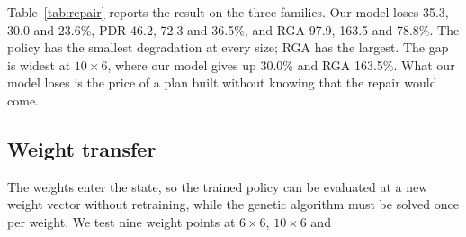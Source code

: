 Table~\ref{tab:repair} reports the result on the three families. Our model loses 35.3, 30.0 and 23.6\%, PDR 46.2, 72.3 and 36.5\%, and RGA
97.9, 163.5 and 78.8\%. The policy has the smallest degradation at every size;
RGA has the largest. The gap is widest
at $10\times6$, where our model gives up 30.0\% and RGA 163.5\%. What our model loses is the price of a plan built without knowing that the repair
would come.

\subsection{Weight transfer}
\label{sec:weights}

The weights enter the state, so the trained policy can be evaluated at a new weight
vector without retraining, while the genetic algorithm must be solved once
per weight. We test nine weight points at $6\times6$, $10\times6$ and
